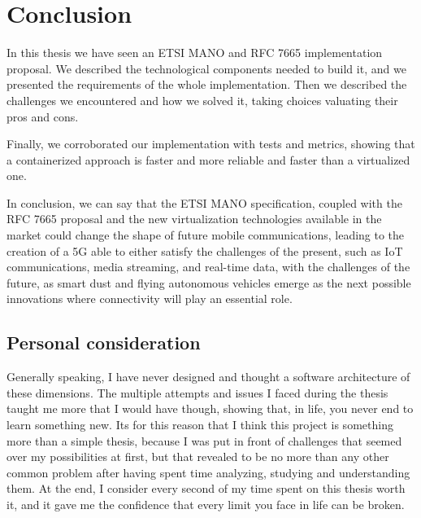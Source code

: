 \chapter{Conclusion}
\label{chap:conclusions}

In this thesis we have seen an ETSI MANO and RFC 7665 implementation proposal. 
We described the technological components needed to build it, and we presented 
the requirements of the whole implementation. Then we described the challenges 
we encountered and how we solved it, taking choices valuating their pros and 
cons.

Finally, we corroborated our implementation with tests and metrics, showing 
that a containerized approach is faster and more reliable and faster than a 
virtualized one.

In conclusion, we can say that the ETSI MANO specification, coupled with the 
RFC 7665 proposal and the new virtualization technologies available in the 
market could change the shape of future mobile communications, leading to the 
creation of a 5G able to either satisfy the challenges of the present, such as 
IoT communications, media streaming, and real-time data, with the challenges of 
the future, as smart dust and flying autonomous vehicles emerge as the next 
possible innovations where connectivity will play an essential role.

\section*{Personal consideration}

Generally speaking, I have never designed and thought a software architecture of
these dimensions. The multiple attempts and issues I faced during the thesis
taught me more that I would have though, showing that, in life, you never end to
learn something new. Its for this reason that I think this project is something
more than a simple thesis, because I was put in front of challenges that seemed
over my possibilities at first, but that revealed to be no more than any other
common problem after having spent time analyzing, studying and understanding
them. At the end, I consider every second of my time spent on this thesis worth
it, and it gave me the confidence that every limit you face in life can be
broken.
